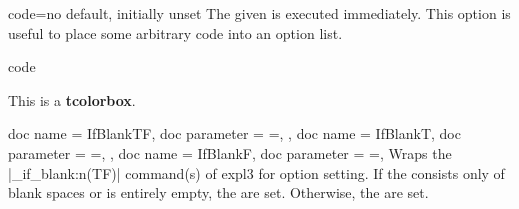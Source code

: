 \begin{docTcbKey}{code}{=}{no default, initially unset}
  The given  is executed immediately. This option is useful
  to place some arbitrary code into an option list.
\begin{exdispExample}{code}

\begin{tcolorbox}[code={\newcommand{\mycommand}{\textit{working}}},
  title=My \mycommand\ title]
This is a \textbf{tcolorbox}.
\end{tcolorbox}
\end{exdispExample}
\end{docTcbKey}

\clearpage

\begin{docTcbKeys}[doc description = {no default}, doc new = 2022-05-25 ]
  {
    {
      doc name        = IfBlankTF,
      doc parameter   = {=},
    },
    {
      doc name        = IfBlankT,
      doc parameter   = {=},
    },
    {
      doc name        = IfBlankF,
      doc parameter   = {=},
    }
  }
  Wraps the |\tl_if_blank:n(TF)| command(s) of \textsf{expl3} for option setting.
  If the  consists only of blank spaces or is entirely empty, the  are set.
  Otherwise, the  are set.
\end{docTcbKeys}

\medskip

